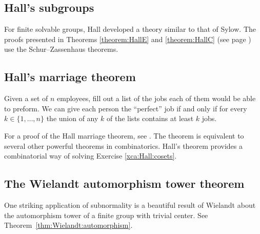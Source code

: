 
\subsection*{Hall's subgroups}

For finite solvable groups, Hall developed a theory similar to that of Sylow. The proofs
presented in Theorems \ref{theorem:HallE} and \ref{theorem:HallC} (see page \pageref{theorem:HallC}) use
the Schur--Zassenhaus theorems. 


\subsection*{Hall's marriage theorem}

Given a set of $n$ employees, fill out a list of the jobs each of them
would be able to preform. We can give each person the ``perfect'' job
if and only if for every $k\in\{1,\dots,n\}$ 
the union of any $k$ of the lists contains at least $k$ jobs. 

For a proof of the Hall marriage theorem, see \cite{MR33330}. The theorem is equivalent to several other
powerful theorems in combinatorics. Hall's theorem 
provides a combinatorial way of solving 
Exercise \ref{xca:Hall:cosets}. 


\subsection*{The Wielandt automorphism tower theorem}

One striking application of subnormality is a beautiful result 
of Wielandt about the automorphism tower of a finite group 
with trivial center. See 
Theorem~\ref{thm:Wielandt:automorphism}.